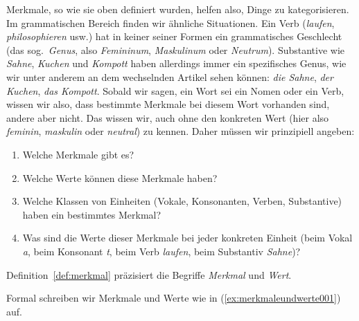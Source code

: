 
Merkmale, so wie sie oben definiert wurden, helfen also, Dinge zu kategorisieren.
Im grammatischen Bereich finden wir ähnliche Situationen.
Ein Verb (\textit{laufen}, \textit{philosophieren} usw.) hat in keiner seiner Formen ein grammatisches Geschlecht (das sog.\ \textit{Genus}, also \textit{Femininum}, \textit{Maskulinum} oder \textit{Neutrum}).
Substantive wie \textit{Sahne}, \textit{Kuchen} und \textit{Kompott} haben allerdings immer ein spezifisches Genus, wie wir unter anderem an dem wechselnden Artikel sehen können: \textit{die Sahne}, \textit{der Kuchen}, \textit{das Kompott}.
Sobald wir sagen, ein Wort sei ein Nomen oder ein Verb, wissen wir also, dass bestimmte Merkmale bei diesem Wort vorhanden sind, andere aber nicht.
Das wissen wir, auch ohne den konkreten Wert (hier also \textit{feminin}, \textit{maskulin} oder \textit{neutral}) zu kennen.
Daher müssen wir prinzipiell angeben:

\begin{enumerate}
  \item Welche Merkmale gibt es?
  \item Welche Werte können diese Merkmale haben?
  \item Welche Klassen von Einheiten (\zB Vokale, Konsonanten, Verben, Substantive) haben ein bestimmtes Merkmal?
  \item Was sind die Werte dieser Merkmale bei jeder konkreten Einheit (beim Vokal \textit{a}, beim Konsonant \textit{t}, beim Verb \textit{laufen}, beim Substantiv \textit{Sahne})?
\end{enumerate}

Definition~\ref{def:merkmal} präzisiert die Begriffe \textit{Merkmal} und \textit{Wert}.


Formal schreiben wir Merkmale und Werte wie in (\ref{ex:merkmaleundwerte001}) auf.

\begin{exe}
  \ex\label{ex:merkmaleundwerte001}
  \begin{xlist}
  \end{xlist}
\end{exe}

